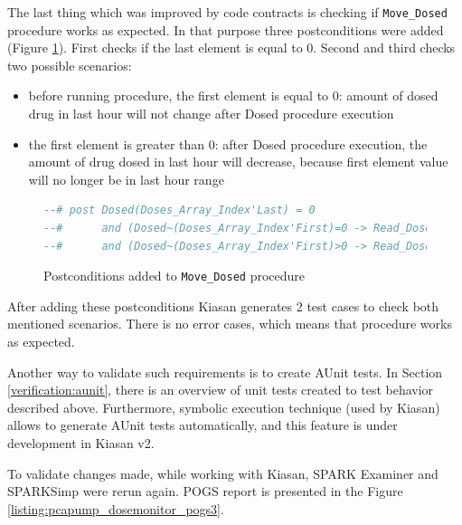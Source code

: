 The last thing which was improved by code contracts is checking if \lstinline{Move_Dosed} procedure works as expected. In that purpose three postconditions were added (Figure \ref{listing:postconditions_added_to_move_dosed}). First checks if the last element is equal to 0. Second and third checks two possible scenarios: 
\begin{itemize} \itemsep0pt \parskip0pt 
    \item before running procedure, the first element is equal to 0: amount of dosed drug in last hour will not change after Dosed procedure execution
    \item the first element is greater than 0: after Dosed procedure execution, the amount of drug dosed in last hour will decrease, because first element value will no longer be in last hour range
\end{itemize}

\begin{figure}[h]
\singlespacing
\begin{lstlisting}[language=ada, frame=single, gobble=0]
--# post Dosed(Doses_Array_Index'Last) = 0 
--#      and (Dosed~(Doses_Array_Index'First)=0 -> Read_Dosed(Dosed~) = Read_Dosed(Dosed))
--#      and (Dosed~(Doses_Array_Index'First)>0 -> Read_Dosed(Dosed~) > Read_Dosed(Dosed));
\end{lstlisting}
\doublespacing
\caption{Postconditions added to \lstinline{Move_Dosed} procedure}
\label{listing:postconditions_added_to_move_dosed}
\end{figure}

After adding these postconditions Kiasan generates 2 test cases to check both mentioned scenarios. There is no error cases, which means that procedure works as expected. 

Another way to validate such requirements is to create AUnit tests. In Section \ref{verification:aunit}, there is an overview of unit tests created to test behavior described above. Furthermore, symbolic execution technique (used by Kiasan) allows to generate AUnit tests automatically, and this feature is under development in Kiasan v2.

To validate changes made, while working with Kiasan, SPARK Examiner and SPARKSimp were rerun again. POGS report is presented in the Figure \ref{listing:pcapump_dosemonitor_pogs3}.

